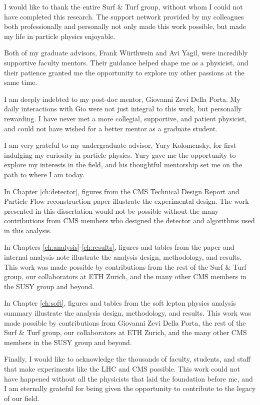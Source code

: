 \begin{frontmatter}
\begin{acknowledgements}
I would like to thank the entire Surf \& Turf group, without whom I could not have completed this research. The support network provided by my colleagues both professionally and personally not only made this work possible, but made my life in particle physics enjoyable.

Both of my graduate advisors, Frank W\"urthwein and Avi Yagil, were incredibly supportive faculty mentors. Their guidance helped shape me as a physicist, and their patience granted me the opportunity to explore my other passions at the same time.

I am deeply indebted to my post-doc mentor, Giovanni Zevi Della Porta. My daily interactions with Gio were not just integral to this work, but personally rewarding. I have never met a more collegial, supportive, and patient physicist, and could not have wished for a better mentor as a graduate student.

I am very grateful to my undergraduate advisor, Yury Kolomensky, for first indulging my curiosity in particle physics. Yury gave me the opportunity to explore my interests in the field, and his thoughtful mentorship set me on the path to where I am today.

In Chapter \ref{ch:detector}, figures from the CMS Technical Design Report and Particle Flow reconstruction paper illustrate the experimental design. The work presented in this dissertation would not be possible without the many contributions from CMS members who designed the detector and algorithms used in this analysis.

In Chapters \ref{ch:analysis}-\ref{ch:results}, figures and tables from the \mttwo paper and internal analysis note illustrate the analysis design, methodology, and results. This work was made possible by contributions from the rest of the Surf \& Turf group, our collaborators at ETH Zurich, and the many other CMS members in the SUSY group and beyond.

In Chapter \ref{ch:soft}, figures and tables from the soft lepton physics analysis summary illustrate the analysis design, methodology, and results. This work was made possible by contributions from Giovanni Zevi Della Porta, the rest of the Surf \& Turf group, our collaborators at ETH Zurich, and the many other CMS members in the SUSY group and beyond.

Finally, I would like to acknowledge the thousands of faculty, students, and staff that make experiments like the LHC and CMS possible. This work could not have happened without all the physicists that laid the foundation before me, and I am eternally grateful for being given the opportunity to contribute to the legacy of our field. 


\end{acknowledgements}
\end{frontmatter}
